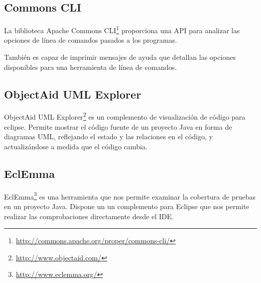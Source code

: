 \subsection{Commons CLI}
La biblioteca Apache Commons CLI\footnote{\url{http://commons.apache.org/proper/commons-cli/}} proporciona una API para analizar las opciones de línea de comandos pasados a los programas.

También es capaz de imprimir mensajes de ayuda que detallan las opciones disponibles para una herramienta de línea de comandos.

\subsection{ObjectAid UML Explorer}
ObjectAid UML Explorer\footnote{\url{http://www.objectaid.com/}} es un complemento de visualización de código para eclipse.
Permite mostrar el código fuente de un proyecto Java en forma de diagramas UML, reflejando el estado y las relaciones en el código, y actualizándose a medida que el código cambia.


\subsection{EclEmma}
EclEmma\footnote{\url{http://www.eclemma.org/}} es una herramienta que nos permite examinar la cobertura de pruebas en un proyecto Java.
Dispone un un complemento para Eclipse que nos permite realizar las comprobaciones directamente desde el IDE.






